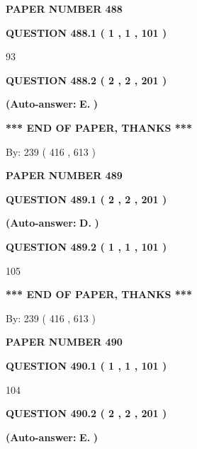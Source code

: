 \documentclass{ctexart}
\begin{document}
   
 {\textbf{ \Large{ PAPER NUMBER  488  }}}
   
   
   
   
  
  
{\textbf{\large{QUESTION
488.1 
 ( 1 , 1 , 101 )
}}}

93
  
  
{\textbf{\large{QUESTION
488.2 
 ( 2 , 2 , 201 )
}}}
 
 
{\textbf{(Auto-answer:}}
{\textbf{\large{
E.}}}
{\textbf{)}}
 
 
   
   
   
   
\vspace{1.0in} 
{\textbf{\large{ *** END OF PAPER, THANKS *** }}} 
   
   
\hspace{1.0in} By: 
 239 ( 416 ,  613 )
   
   
   
   
\newpage 
\setcounter{page}{ 
   489001 } 
   
   
 {\textbf{ \Large{ PAPER NUMBER  489  }}}
   
   
   
   
  
  
{\textbf{\large{QUESTION
489.1 
 ( 2 , 2 , 201 )
}}}
 
 
{\textbf{(Auto-answer:}}
{\textbf{\large{
D.}}}
{\textbf{)}}
 
 
  
  
{\textbf{\large{QUESTION
489.2 
 ( 1 , 1 , 101 )
}}}

105
   
   
   
   
\vspace{1.0in} 
{\textbf{\large{ *** END OF PAPER, THANKS *** }}} 
   
   
\hspace{1.0in} By: 
 239 ( 416 ,  613 )
   
   
   
   
\newpage 
\setcounter{page}{ 
   490001 } 
   
   
 {\textbf{ \Large{ PAPER NUMBER  490  }}}
   
   
   
   
  
  
{\textbf{\large{QUESTION
490.1 
 ( 1 , 1 , 101 )
}}}

104
  
  
{\textbf{\large{QUESTION
490.2 
 ( 2 , 2 , 201 )
}}}
 
 
{\textbf{(Auto-answer:}}
{\textbf{\large{
E.}}}
{\textbf{)}}
 
\end{document}
